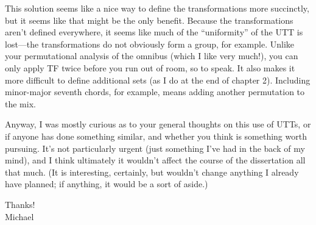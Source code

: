 \documentclass[12pt]{article}
\newcommand{\blank}{\vspace{1em}}
\begin{document}
This solution seems like a nice way to define the transformations more
succinctly, but it seems like that might be the only benefit. Because the
transformations aren't defined everywhere, it seems like much of the
``uniformity'' of the UTT is lost---the transformations do not obviously form
a group, for example. Unlike your permutational analysis of the
omnibus (which I like very much!), you can only apply TF twice before you run
out of room, so to speak. It also makes it more difficult to define additional
sets (as I do at the end of chapter 2). Including minor-major seventh chords,
for example, means adding another permutation to the mix.

Anyway, I was mostly curious as to your general thoughts on this use of UTTs,
or if anyone has done something similar, and whether you think is something
worth pursuing. It's not particularly urgent (just something I've had in the
back of my mind), and I think ultimately it wouldn't affect the course of the
dissertation all that much. (It is interesting, certainly, but wouldn't change
anything I already have planned; if anything, it would be a sort of aside.)

\blank

\noindent Thanks! \\
\noindent Michael
\end{document}
